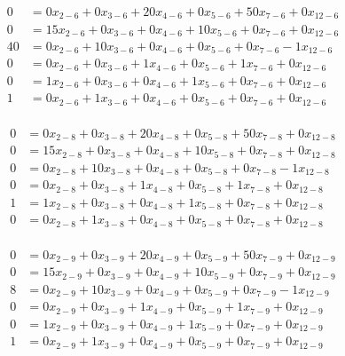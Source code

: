 \vspace{-\baselineskip}\begin{align*}
0 &= 0x_{2-6}+0x_{3-6}+20x_{4-6}+0x_{5-6}+50x_{7-6}+0x_{12-6} \\ 
	0 &= 15x_{2-6}+0x_{3-6}+0x_{4-6}+10x_{5-6}+0x_{7-6}+0x_{12-6} \\ 
	40 &= 0x_{2-6}+10x_{3-6}+0x_{4-6}+0x_{5-6}+0x_{7-6}-1x_{12-6} \\ 
	0 &= 0x_{2-6}+0x_{3-6}+1x_{4-6}+0x_{5-6}+1x_{7-6}+0x_{12-6} \\ 
	0 &= 1x_{2-6}+0x_{3-6}+0x_{4-6}+1x_{5-6}+0x_{7-6}+0x_{12-6} \\ 
	1 &= 0x_{2-6}+1x_{3-6}+0x_{4-6}+0x_{5-6}+0x_{7-6}+0x_{12-6} \\
\end{align*}

\vspace{-\baselineskip}\begin{align*}
0 &= 0x_{2-8}+0x_{3-8}+20x_{4-8}+0x_{5-8}+50x_{7-8}+0x_{12-8} \\ 
	0 &= 15x_{2-8}+0x_{3-8}+0x_{4-8}+10x_{5-8}+0x_{7-8}+0x_{12-8} \\ 
	0 &= 0x_{2-8}+10x_{3-8}+0x_{4-8}+0x_{5-8}+0x_{7-8}-1x_{12-8} \\ 
	0 &= 0x_{2-8}+0x_{3-8}+1x_{4-8}+0x_{5-8}+1x_{7-8}+0x_{12-8} \\ 
	1 &= 1x_{2-8}+0x_{3-8}+0x_{4-8}+1x_{5-8}+0x_{7-8}+0x_{12-8} \\ 
	0 &= 0x_{2-8}+1x_{3-8}+0x_{4-8}+0x_{5-8}+0x_{7-8}+0x_{12-8} \\
\end{align*}

\vspace{-\baselineskip}\begin{align*}
0 &= 0x_{2-9}+0x_{3-9}+20x_{4-9}+0x_{5-9}+50x_{7-9}+0x_{12-9} \\ 
	0 &= 15x_{2-9}+0x_{3-9}+0x_{4-9}+10x_{5-9}+0x_{7-9}+0x_{12-9} \\ 
	8 &= 0x_{2-9}+10x_{3-9}+0x_{4-9}+0x_{5-9}+0x_{7-9}-1x_{12-9} \\ 
	0 &= 0x_{2-9}+0x_{3-9}+1x_{4-9}+0x_{5-9}+1x_{7-9}+0x_{12-9} \\ 
	0 &= 1x_{2-9}+0x_{3-9}+0x_{4-9}+1x_{5-9}+0x_{7-9}+0x_{12-9} \\ 
	1 &= 0x_{2-9}+1x_{3-9}+0x_{4-9}+0x_{5-9}+0x_{7-9}+0x_{12-9} \\
\end{align*}

